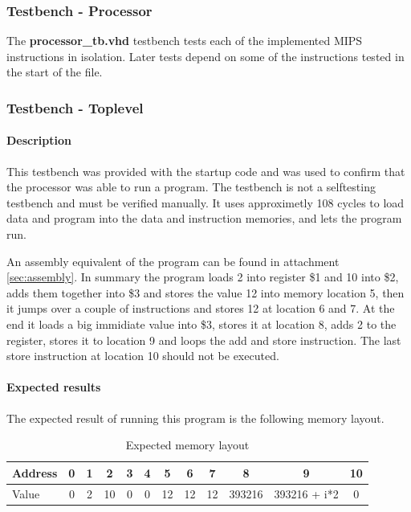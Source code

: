 \subsubsection{Testbench - Processor}
The {\bf processor\_tb.vhd} testbench tests each of the implemented MIPS instructions in isolation. Later tests depend on some of the instructions tested in the start of the file.
\subsubsection{Testbench - Toplevel}

\paragraph{Description}

This testbench was provided with the startup code and was used to confirm that the processor was able to run a program. The testbench is not a selftesting testbench and must be verified manually. It uses approximetly 108 cycles to load data and program into the data and instruction memories, and lets the program run.

An assembly equivalent of the program can be found in attachment \ref{sec:assembly}.
In summary the program loads 2 into register \$1 and 10 into \$2, adds them together into \$3 and stores the value 12 into memory location 5, then it jumps over a couple of instructions and stores 12 at location 6 and 7. At the end it loads a big immidiate value into \$3, stores it at location 8, adds 2 to the register, stores it to location 9 and loops the add and store instruction. The last store instruction at location 10 should not be executed.

\paragraph{Expected results}
\label{sec:exp_res}
The expected result of running this program is the following memory layout. 
\begin{table}[h]

	\begin{tabular}{|l|c|c|c|c|c|c|c|c|c|c|c|}
		\hline
		Address &  0 &  1 &  2 &  3 &  4 &  5 &  6 &  7 &  8 &  9 & 10 \\
		\hline
		Value   &  0 &  2 & 10 &  0 & 0 & 12  & 12 & 12 & 393216 & 393216 + i*2 & 0\\
		\hline
	\end{tabular}
	\caption{Expected memory layout}
	\label{table:exp_res}
\end{table}

